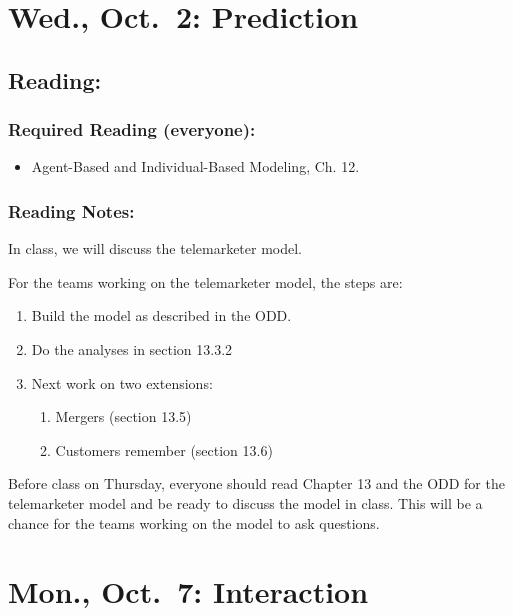 \documentclass[
]{article}
\providecommand{\tightlist}{%
  \setlength{\itemsep}{0pt}\setlength{\parskip}{0pt}}
\begin{document}
\section{Wed., Oct.~2: Prediction}\label{wed.-oct.-2-prediction}

\subsection{Reading:}\label{reading-12}

\subsubsection{Required Reading
(everyone):}\label{required-reading-everyone-11}

\begin{itemize}
\tightlist
\item
  Agent-Based and Individual-Based Modeling, Ch. 12.
\end{itemize}

\subsubsection{Reading Notes:}\label{reading-notes-11}

In class, we will discuss the telemarketer model.

For the teams working on the telemarketer model, the steps are:

\begin{enumerate}
\def\labelenumi{\arabic{enumi}.}
\tightlist
\item
  Build the model as described in the ODD.
\item
  Do the analyses in section 13.3.2
\item
  Next work on two extensions:

  \begin{enumerate}
  \def\labelenumii{\arabic{enumii}.}
  \tightlist
  \item
    Mergers (section 13.5)
  \item
    Customers remember (section 13.6)
  \end{enumerate}
\end{enumerate}

Before class on Thursday, everyone should read Chapter 13 and the ODD
for the telemarketer model and be ready to discuss the model in class.
This will be a chance for the teams working on the model to ask
questions.

\section{Mon., Oct.~7: Interaction}\label{mon.-oct.-7-interaction}
\end{document}
